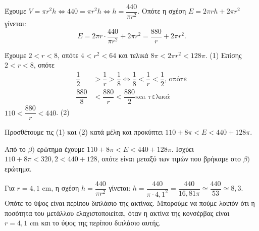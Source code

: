 
\begin{alist}
\item Έχουμε $V = \pi r^2 h \Leftrightarrow 440 = \pi r^2 h \Leftrightarrow h = \dfrac{440}{\pi r^2}$. Οπότε η σχέση $E = 2\pi rh + 2\pi r^2$ γίνεται:
\[E = 2\pi r \cdot \dfrac{440}{\pi r^2} + 2\pi r^2 = \dfrac{880}{r} + 2\pi r^2.\]

\item Έχουμε $2 < r < 8$, οπότε
$4 < r^2 < 64$ και τελικά
$8\pi < 2\pi r^2 < 128\pi$. (1)
Επίσης $2 < r < 8$, οπότε
\begin{align*}
\dfrac{1}{2} &> \dfrac{1}{r} > \dfrac{1}{8} \Leftrightarrow \dfrac{1}{8} < \dfrac{1}{r} < \dfrac{1}{2}\text{, οπότε} \\
\dfrac{880}{8} &< \dfrac{880}{r} < \dfrac{880}{2}\text{και τελικά}
\end{align*}
$110 < \dfrac{880}{r} < 440$. (2)

Προσθέτουμε τις (1) και (2) κατά μέλη και προκύπτει $110 + 8\pi < E < 440 + 128\pi$.

\item
\begin{rlist}
\item Από το $\beta)$ ερώτημα έχουμε $110 + 8\pi < E < 440 + 128\pi$. Ισχύει
$110 + 8\pi < 320,2 < 440 + 128$, οπότε είναι μεταξύ των τιμών που βρήκαμε στο $\beta)$ ερώτημα.
\item Για $r = 4,1\text{ cm}$, η σχέση $h = \dfrac{440}{\pi r^2}$ γίνεται: $h = \dfrac{440}{\pi \cdot 4,1^2} = \dfrac{440}{16,81\pi} \simeq \dfrac{440}{53} \simeq 8,3$. Οπότε το ύψος είναι περίπου διπλάσιο της ακτίνας. Μπορούμε να πούμε λοιπόν ότι η ποσότητα του μετάλλου ελαχιστοποιείται, όταν η ακτίνα της κονσέρβας είναι $r = 4,1\text{ cm}$ και το ύψος της περίπου διπλάσιο αυτής.
\end{rlist}
\end{alist}

